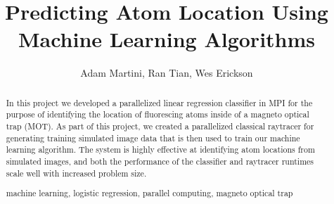 \documentclass[runningheads,a4paper,11pt]{llncs}
\newcommand{\keywords}[1]{\par\addvspace\baselineskip
\noindent\keywordname\enspace\ignorespaces#1}
\begin{document}
\mainmatter  %

\title{Predicting Atom Location Using \\ Machine Learning Algorithms}


%
%
\author{Adam Martini, Ran Tian, Wes Erickson}


%
%

\maketitle

\begin{abstract}

In this project we developed a parallelized linear regression classifier in MPI for the purpose of identifying the location of fluorescing atoms inside of a magneto optical trap (MOT). As part of this project, we created a parallelized classical raytracer for generating training simulated image data that is then used to train our machine learning algorithm. The system is highly effective at identifying atom locations from simulated images, and both the performance of the classifier and raytracer runtimes scale well with increased problem size.

\keywords{machine learning, logistic regression, parallel computing, magneto optical trap}
\end{abstract}

















\end{document}
